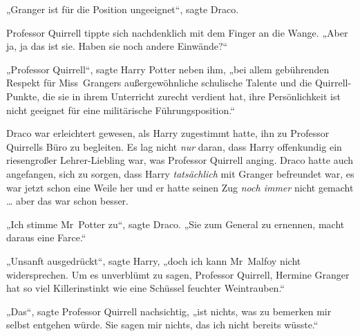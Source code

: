 „Granger ist für die Position ungeeignet“, sagte Draco.

Professor Quirrell tippte sich nachdenklich mit dem Finger an die Wange.
„Aber ja, ja das ist sie. Haben sie noch andere Einwände?“

„Professor Quirrell“, sagte Harry Potter neben ihm, „bei allem gebührenden Respekt für Miss~Grangers außergewöhnliche schulische Talente und die Quirrell-Punkte, die sie in ihrem Unterricht zurecht verdient hat, ihre Persönlichkeit ist nicht geeignet für eine militärische Führungsposition.“

Draco war erleichtert gewesen, als Harry zugestimmt hatte, ihn zu Professor Quirrells Büro zu begleiten. Es lag nicht \emph{nur} daran, dass Harry offenkundig ein riesengroßer Lehrer-Liebling war, was Professor Quirrell anging. Draco hatte auch angefangen, sich zu sorgen, dass Harry \emph{tatsächlich} mit Granger befreundet war, es war jetzt schon eine Weile her und er hatte seinen Zug \emph{noch immer} nicht gemacht … aber das war schon besser.

„Ich stimme Mr~Potter zu“, sagte Draco.
„Sie zum General zu ernennen, macht daraus eine Farce.“

„Unsanft ausgedrückt“, sagte Harry, „doch ich kann Mr~Malfoy nicht widersprechen. Um es unverblümt zu sagen, Professor Quirrell, Hermine Granger hat so viel Killerinstinkt wie eine Schüssel feuchter Weintrauben.“

„Das“, sagte Professor Quirrell nachsichtig, „ist nichts, was zu bemerken mir selbst entgehen würde. Sie sagen mir nichts, das ich nicht bereits wüsste.“

